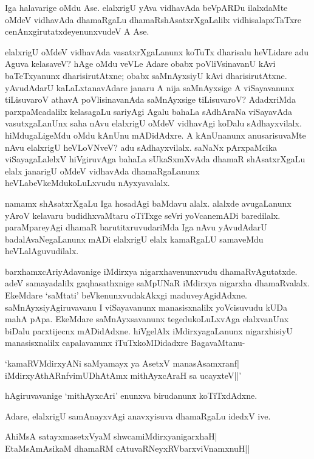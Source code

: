 Iga halavarige oMdu Ase. elalxrigU yAva vidhavAda beVpARDu ilalxdaMte oMdeV vidhavAda dhamaRgaLu dhamaRshAsatxrXgaLalilx vidhisalapxTaTxre cenAnxgirutatxdeyenunxvudeV A Ase.

elalxrigU oMdeV vidhavAda vasatxrXgaLanunx koTuTx dharisalu heVLidare adu Aguva kelasaveV? hAge oMdu veVLe Adare obabx poVliVsinavanU kAvi baTeTxyanunx dharisirutAtxne; obabx saMnAyxsiyU kAvi dharisirutAtxne. yAvudAdarU kaLaLxtanavAdare janaru A nija saMnAyxsige A viSayavanunx tiLisuvaroV athavA poVlisinavanAda saMnAyxsige tiLisuvaroV? AdadxriMda parxpaMcadalilx kelasagaLu sariyAgi Agalu bahaLa sAdhAraNa viSayavAda vasutxgaLanUnx saha nAvu elalxrigU oMdeV vidhavAgi koDalu sAdhayxvilalx. hiMdugaLigeMdu oMdu kAnUnu mADidAdxre. A kAnUnanunx anusarisuvaMte nAvu elalxrigU heVLoVNveV? adu sAdhayxvilalx. saNaNx pArxpaMcika viSayagaLalelxV hiVgiruvAga bahaLa sUkaSxmXvAda dhamaR shAsatxrXgaLu elalx janarigU oMdeV vidhavAda dhamaRgaLanunx heVLabeVkeMdukoLuLxvudu nAyxyavalalx.

namamx shAsatxrXgaLu Iga hosadAgi baMdavu alalx. alalxde avugaLanunx yAroV kelavaru budidhxvaMtaru oTiTxge seVri yoVcanemADi baredilalx. paraMpareyAgi dhamaR barutitxruvudariMda Iga nAvu yAvudAdarU badalAvaNegaLanunx mADi elalxrigU elalx kamaRgaLU samaveMdu heVLalAguvudilalx.

barxhamxcAriyAdavanige iMdirxya nigarxhavenunxvudu dhamaRvAgutatxde. adeV samayadalilx gaqhasathxnige saMpUNaR iMdirxya nigarxha dhamaRvalalx. EkeMdare `saMtati' beVkenunxvudakAkxgi maduveyAgidAdxne. saMnAyxsiyAgiruvavanu I viSayavanunx manasisxnalilx yoVcisuvudu kUDa mahA pApa. EkeMdare saMnAyxsavanunx tegedukoLuLxvAga elalxvanUnx biDalu parxtijecnx mADidAdxne. hiVgelAlx iMdirxyagaLanunx nigarxhisiyU manasisxnalilx capalavanunx iTuTxkoMDidadxre BagavaMtanu-

\begin{shloka}
`kamaRVMdirxyANi saMyamayx ya AsetxV manasAsamxranf|\\
iMdirxyAthARnfvimUDhAtAmx mithAyxcAraH sa ucayxteV||'
\end{shloka}

hAgiruvavanige `mithAyxcAri' enunxva birudanunx koTiTxdAdxne.

Adare, elalxrigU samAnayxvAgi anavxyisuva dhamaRgaLu idedxV ive.

\begin{shloka}
AhiMsA satayxmasetxVyaM shwcamiMdirxyanigarxhaH|\\
EtaMsAmAsikaM dhamaRM cAtuvaRNeyxRV\s barxviVnamxnuH||
\end{shloka}

